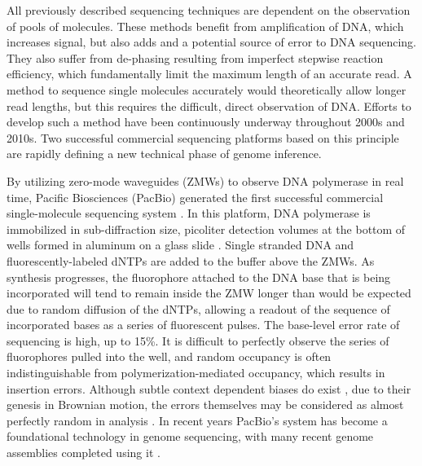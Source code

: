 All previously described sequencing techniques are dependent on the observation of pools of molecules.
These methods benefit from amplification of DNA, which increases signal, but also adds and a potential source of error to DNA sequencing.
They also suffer from de-phasing resulting from imperfect stepwise reaction efficiency, which fundamentally limit the maximum length of an accurate read.
A method to sequence single molecules accurately would theoretically allow longer read lengths, but this requires the difficult, direct observation of DNA.
Efforts to develop such a method have been continuously underway throughout 2000s and 2010s.
Two successful commercial sequencing platforms based on this principle are rapidly defining a new technical phase of genome inference.

By utilizing zero-mode waveguides (ZMWs) to observe DNA polymerase in real time, Pacific Biosciences (PacBio) generated the first successful commercial single-molecule sequencing system \cite{eid2008real}.
In this platform, DNA polymerase is immobilized in sub-diffraction size, picoliter detection volumes at the bottom of wells formed in aluminum on a glass slide \cite{korlach2008selective}.
Single stranded DNA and fluorescently-labeled dNTPs are added to the buffer above the ZMWs.
As synthesis progresses, the fluorophore attached to the DNA base that is being incorporated will tend to remain inside the ZMW longer than would be expected due to random diffusion of the dNTPs, allowing a readout of the sequence of incorporated bases as a series of fluorescent pulses.
The base-level error rate of sequencing is high, up to 15\%.
It is difficult to perfectly observe the series of fluorophores pulled into the well, and random occupancy is often indistinguishable from polymerization-mediated occupancy, which results in insertion errors.
Although subtle context dependent biases do exist \cite{ono2012pbsim}, due to their genesis in Brownian motion, the errors themselves may be considered as almost perfectly random in analysis \cite{ross2013characterizing,myers2014efficient}.
In recent years PacBio's system has become a foundational technology in genome sequencing, with many recent genome assemblies completed using it \cite{rhoads2015pacbio}.

